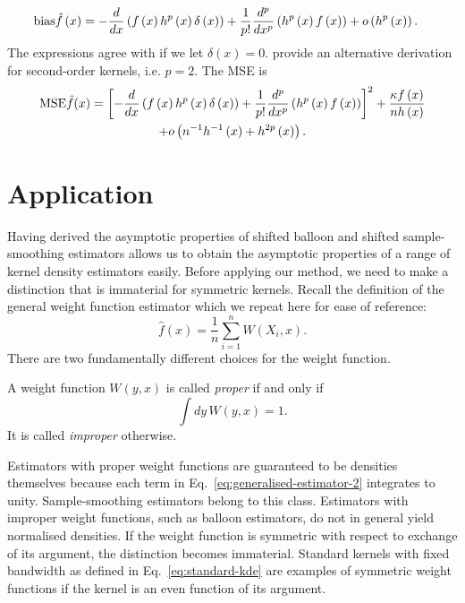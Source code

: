 \begin{align}
\bias\hat{f}\left(x\right) & =-\frac{d}{dx}\left(f\left(x\right)h^{p}\left(x\right)\delta\left(x\right)\right)+\frac{1}{p!}\frac{d^{p}}{dx^{p}}\left(h^{p}\left(x\right)f\left(x\right)\right)+o\left(h^{p}\left(x\right)\right).\label{eq:smoothing-bias}
\end{align}
The expressions agree with \citet{Terrell1992} if we let $\delta\left(x\right)=0$. \citet{Jones1994} provide an alternative derivation for second-order kernels, i.e. $p=2$. The MSE is 
\begin{multline*}
\mse\hat{f}(x)=\left[-\frac{d}{dx}\left(f\left(x\right)h^{p}\left(x\right)\delta\left(x\right)\right)+\frac{1}{p!}\frac{d^{p}}{dx^{p}}\left(h^{p}\left(x\right)f\left(x\right)\right)\right]^{2}+\frac{\kappa f\left(x\right)}{nh\left(x\right)}\\
+o\left(n^{-1}h^{-1}\left(x\right)+h^{2p}\left(x\right)\right).
\end{multline*}



\section{Application\label{sec:application}}

Having derived the asymptotic properties of shifted balloon and shifted sample-smoothing estimators allows us to obtain the asymptotic properties of a range of kernel density estimators easily. Before applying our method, we need to make a distinction that is immaterial for symmetric kernels. Recall the definition of the general weight function estimator which we repeat here for ease of reference: 
\begin{equation}
\hat{f}\left(x\right)=\frac{1}{n}\sum_{i=1}^{n}W\left(X_{i},x\right).\label{eq:generalised-estimator-2}
\end{equation}
There are two fundamentally different choices for the weight function.
\begin{defn}
A weight function $W\left(y,x\right)$ is called \emph{proper} if and only if 
\[
\int dy\,W\left(y,x\right)=1.
\]
It is called \emph{improper} otherwise.
\end{defn}
Estimators with proper weight functions are guaranteed to be densities themselves because each term in Eq.~\eqref{eq:generalised-estimator-2} integrates to unity. Sample-smoothing estimators belong to this class. Estimators with improper weight functions, such as balloon estimators, do not in general yield normalised densities. If the weight function is symmetric with respect to exchange of its argument, the distinction becomes immaterial. Standard kernels with fixed bandwidth as defined in Eq.~\eqref{eq:standard-kde} are examples of symmetric weight functions if the kernel is an even function of its argument.


